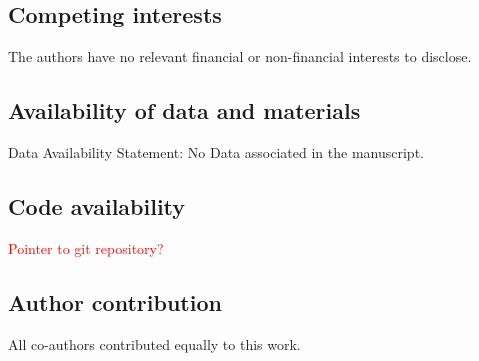 \documentclass[sn-mathphys-num,a4paper,iicol,lineno,pdflatex]{sn-jnl-hacked}
\theoremstyle{thmwithspace}%
\theoremstyle{thmwithspace}%
\begin{document}
\subsection*{Competing interests}
The authors have no relevant financial or non-financial interests to disclose.

\subsection*{Availability of data and materials}
Data Availability Statement: No Data associated in the manuscript.

\subsection*{Code availability}

\textcolor{red}{Pointer to git repository?}

\subsection*{Author contribution}

All co-authors contributed equally to this work.

\begin{appendices}



\end{appendices}

\clearpage


\end{document}
